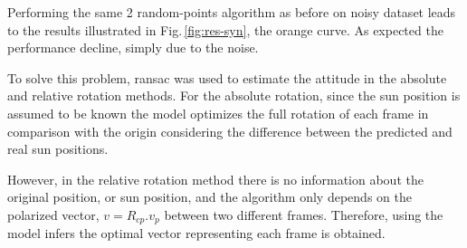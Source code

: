 
Performing the same 2 random-points algorithm as before on noisy dataset leads
to the results illustrated in Fig.\,\ref{fig:res-syn}, the orange curve. As
expected the performance decline, simply due to the noise.


To solve this problem, \gls{ransac} was used to estimate the attitude in the
absolute and relative rotation methods. For the absolute rotation, since the
sun position is assumed to be known the model optimizes the full rotation of
each frame in comparison with the origin considering the difference between the
predicted and real sun positions.

However, in the relative rotation method there is no information about the
original position, or sun position, and the algorithm only depends on the
polarized vector, $v = R_{cp} . v_p$ between two different frames. Therefore,
using the model infers the optimal vector representing each frame is
obtained.

